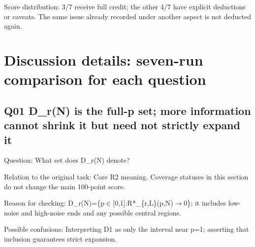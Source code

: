 \documentclass[11pt,a4paper]{article}
\begin{document}
Score distribution: 3/\allowbreak{}7 receive full credit; the other 4/\allowbreak{}7 have explicit deductions or caveats. The same issue already recorded under another aspect is not deducted again.

\clearpage
\section{Discussion details: seven-run comparison for each question}
\subsection{Q01 D\_r(N) is the full-p set; more information cannot shrink it but need not strictly expand it}
\label{aspect:Q01}
Question: What set does D\_r(N) denote?

Relation to the original task: Core R2 meaning. Coverage statuses in this section do not change the main 100-point score.

Reason for checking: D\_r(N)=\{p\ensuremath{\in}[0,\allowbreak{}1]:R*\_\{r,\allowbreak{}L\}(p,\allowbreak{}N)\ensuremath{\rightarrow}0\}; it includes low-noise and high-noise ends and any possible central regions.

Possible confusions: Interpreting D1 as only the interval near p=1; asserting that inclusion guarantees strict expansion.
\end{document}
